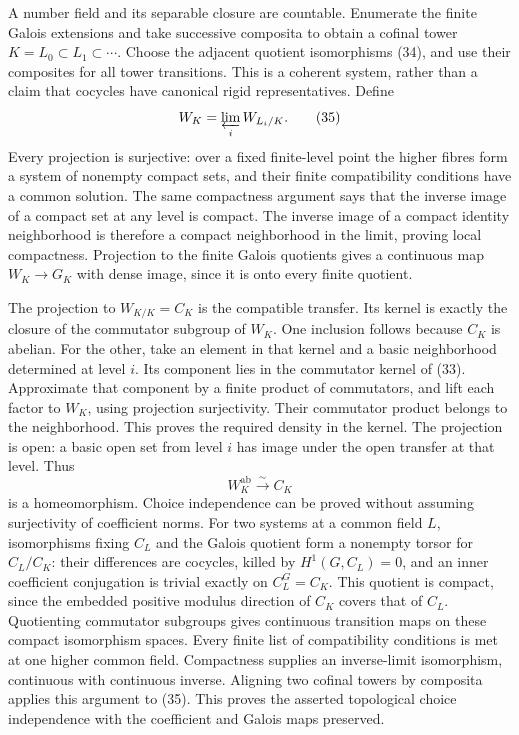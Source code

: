 \documentclass[11pt,a4paper]{article}
\begin{document}
A number field and its separable closure are countable. Enumerate the
finite Galois extensions and take successive composita to obtain a
cofinal tower \(K=L_0\subset L_1\subset\cdots\). Choose the adjacent
quotient isomorphisms (34), and use their composites for all tower
transitions. This is a coherent system, rather than a claim that
cocycles have canonical rigid representatives. Define \[
W_K=\varprojlim_i W_{L_i/K}.
\tag{35}
\] Every projection is surjective: over a fixed finite-level point the
higher fibres form a system of nonempty compact sets, and their finite
compatibility conditions have a common solution. The same compactness
argument says that the inverse image of a compact set at any level is
compact. The inverse image of a compact identity neighborhood is
therefore a compact neighborhood in the limit, proving local
compactness. Projection to the finite Galois quotients gives a
continuous map \(W_K\to G_K\) with dense image, since it is onto every
finite quotient.

The projection to \(W_{K/K}=C_K\) is the compatible transfer. Its kernel
is exactly the closure of the commutator subgroup of \(W_K\). One
inclusion follows because \(C_K\) is abelian. For the other, take an
element in that kernel and a basic neighborhood determined at level
\(i\). Its component lies in the commutator kernel of (33). Approximate
that component by a finite product of commutators, and lift each factor
to \(W_K\), using projection surjectivity. Their commutator product
belongs to the neighborhood. This proves the required density in the
kernel. The projection is open: a basic open set from level \(i\) has
image under the open transfer at that level. Thus \[
W_K^{\mathrm{ab}}\xrightarrow{\sim}C_K
\tag{36}
\] is a homeomorphism. Choice independence can be proved without
assuming surjectivity of coefficient norms. For two systems at a common
field \(L\), isomorphisms fixing \(C_L\) and the Galois quotient form a
nonempty torsor for \(C_L/C_K\): their differences are cocycles, killed
by \(H^1(G,C_L)=0\), and an inner coefficient conjugation is trivial
exactly on \(C_L^G=C_K\). This quotient is compact, since the embedded
positive modulus direction of \(C_K\) covers that of \(C_L\).
Quotienting commutator subgroups gives continuous transition maps on
these compact isomorphism spaces. Every finite list of compatibility
conditions is met at one higher common field. Compactness supplies an
inverse-limit isomorphism, continuous with continuous inverse. Aligning
two cofinal towers by composita applies this argument to (35). This
proves the asserted topological choice independence with the coefficient
and Galois maps preserved.
\end{document}

